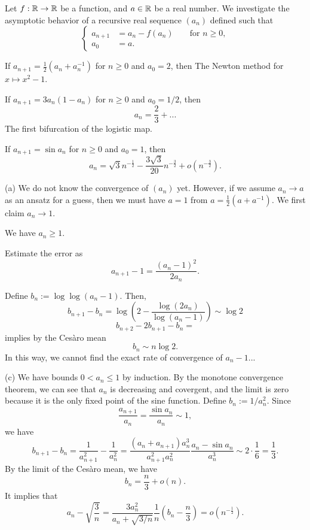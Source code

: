 \documentclass{../../large}
\begin{document}
\begin{prb}

\end{prb}

\begin{prb}

\end{prb}


\begin{prb}

\end{prb}

\begin{prb}
Let $f:\mathbb{R}\to\mathbb{R}$ be a function, and $a\in\mathbb{R}$ be a real number.
We investigate the asymptotic behavior of a recursive real sequence $(a_n)$ defined such that
\[\left\{\begin{aligned}
a_{n+1}&=a_n-f(a_n)&&\text{ for }n\ge0,\\
a_0&=a.&&
\end{aligned}\right.\]
\begin{parts}
\item If $a_{n+1}=\frac12(a_n+a_n^{-1})$ for $n\ge0$ and $a_0=2$, then
The Newton method for $x\mapsto x^2-1$.
\item If $a_{n+1}=3a_n(1-a_n)$ for $n\ge0$ and $a_0=1/2$, then
\[a_n=\frac23+...\]
The first bifurcation of the logistic map.
\item If $a_{n+1}=\sin a_n$ for $n\ge0$ and $a_0=1$, then
\[a_n=\sqrt3n^{-\frac12}-\frac{3\sqrt3}{20}n^{-\frac32}+o(n^{-\frac32}).\]
\end{parts}
\end{prb}
\begin{pf}
(a)
We do not know the convergence of $(a_n)$ yet.
However, if we assume $a_n\to a$ as an ansatz for a guess, then we must have $a=1$ from $a=\frac12(a+a^{-1})$.
We first claim $a_n\to1$.

We have $a_n\ge1$.

Estimate the error as
\[a_{n+1}-1=\frac{(a_n-1)^2}{2a_n}.\]


Define $b_n:=\log\log(a_n-1)$.
Then,
\[b_{n+1}-b_n=\log\left(2-\frac{\log(2a_n)}{\log(a_n-1)}\right)\sim\log2\]
\[b_{n+2}-2b_{n+1}-b_n=\]
implies by the Ces\`aro mean
\[b_n\sim n\log2.\]
In this way, we cannot find the exact rate of convergence of $a_n-1$...



(c)
We have bounds $0<a_n\le1$ by induction.
By the monotone convergence theorem, we can see that $a_n$ is decreasing and covergent, and the limit is zero because it is the only fixed point of the sine function.
Define $b_n:=1/a_n^2$.
Since
\[\frac{a_{n+1}}{a_n}=\frac{\sin a_n}{a_n}\sim1,\]
we have
\[b_{n+1}-b_n=\frac1{a_{n+1}^2}-\frac1{a_n^2}=\frac{(a_n+a_{n+1})a_n^3}{a_{n+1}^2a_n^2}\frac{a_n-\sin a_n}{a_n^3}\sim2\cdot\frac16=\frac13.\]
By the limit of the Ces\`aro mean, we have
\[b_n=\frac n3+o(n).\]
It implies that
\[a_n-\sqrt{\frac 3n}=\frac{3a_n^2}{a_n+\sqrt{3/n}}\frac1n\left(b_n-\frac n3\right)=o(n^{-\frac12}).\]

\end{pf}
\end{document}
